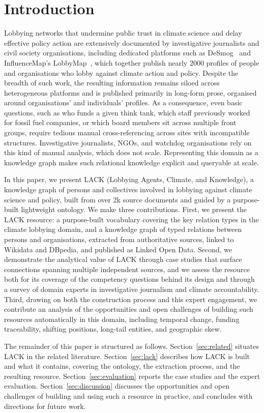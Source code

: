 \section{Introduction}
\label{sec:introduction}
Lobbying networks that undermine public trust in climate science and delay effective policy action are extensively documented by investigative journalists and civil society organisations, including dedicated platforms such as DeSmog~\cite{desmog} and InfluenceMap's LobbyMap~\cite{lobbymap}, which together publish nearly 2000 profiles of people and organisations who lobby against climate action and policy.
Despite the breadth of such work, the resulting information remains siloed across heterogeneous platforms and is published primarily in long-form prose, organised around organisations' and individuals' profiles.
As a consequence, even basic questions, such as who funds a given think tank, which staff previously worked for fossil fuel companies, or which board members sit across multiple front groups, require tedious manual cross-referencing across sites with incompatible structures.
Investigative journalists, NGOs, and watchdog organisations rely on this kind of manual analysis, which does not scale.
Representing this domain as a knowledge graph makes such relational knowledge explicit and queryable at scale.

In this paper, we present LACK (Lobbying Agents, Climate, and Knowledge), a knowledge graph of persons and collectives involved in lobbying against climate science and policy, built from over 2k source documents and guided by a purpose-built lightweight ontology.
We make three contributions.
First, we present the LACK resource: a purpose-built vocabulary covering the key relation types in the climate lobbying domain, and a knowledge graph of typed relations between persons and organisations, extracted from authoritative sources, linked to Wikidata and DBpedia, and published as Linked Open Data.
Second, we demonstrate the analytical value of LACK through case studies that surface connections spanning multiple independent sources, and we assess the resource both for its coverage of the competency questions behind its design and through a survey of domain experts in investigative journalism and climate accountability.
Third, drawing on both the construction process and this expert engagement, we contribute an analysis of the opportunities and open challenges of building such resources automatically in this domain, including temporal change, funding traceability, shifting positions, long-tail entities, and geographic skew.

The remainder of this paper is structured as follows.
Section~\ref{sec:related} situates LACK in the related literature.
Section~\ref{sec:lack} describes how LACK is built and what it contains, covering the ontology, the extraction process, and the resulting resource.
Section~\ref{sec:evaluation} reports the case studies and the expert evaluation.
Section~\ref{sec:discussion} discusses the opportunities and open challenges of building and using such a resource in practice, and concludes with directions for future work.